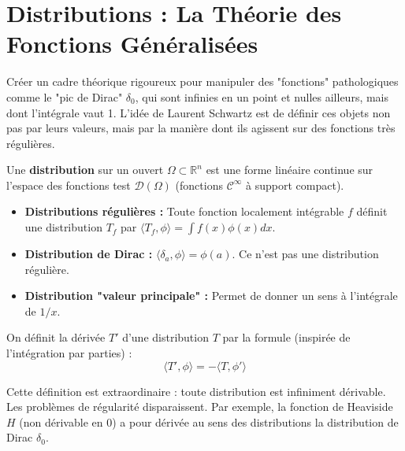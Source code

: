 \section{Distributions : La Théorie des Fonctions Généralisées}

\begin{objectif}
    Créer un cadre théorique rigoureux pour manipuler des "fonctions" pathologiques comme le "pic de Dirac" $\delta_0$, qui sont infinies en un point et nulles ailleurs, mais dont l'intégrale vaut 1. L'idée de Laurent Schwartz est de définir ces objets non pas par leurs valeurs, mais par la manière dont ils agissent sur des fonctions très régulières.
\end{objectif}

\begin{definition}[Distribution]
    Une \textbf{distribution} sur un ouvert $\Omega \subset \mathbb{R}^n$ est une forme linéaire continue sur l'espace des fonctions test $\mathcal{D}(\Omega)$ (fonctions $\mathcal{C}^\infty$ à support compact).
\end{definition}

\begin{example}
    \begin{itemize}
        \item \textbf{Distributions régulières :} Toute fonction localement intégrable $f$ définit une distribution $T_f$ par $\langle T_f, \phi \rangle = \int f(x)\phi(x)dx$.
        \item \textbf{Distribution de Dirac :} $\langle \delta_a, \phi \rangle = \phi(a)$. Ce n'est pas une distribution régulière.
        \item \textbf{Distribution "valeur principale" :} Permet de donner un sens à l'intégrale de $1/x$.
    \end{itemize}
\end{example}

\begin{definition}
    On définit la dérivée $T'$ d'une distribution $T$ par la formule (inspirée de l'intégration par parties) :
    $$ \langle T', \phi \rangle = - \langle T, \phi' \rangle $$
\end{definition}
\begin{remark}
    Cette définition est extraordinaire : toute distribution est infiniment dérivable. Les problèmes de régularité disparaissent. Par exemple, la fonction de Heaviside $H$ (non dérivable en 0) a pour dérivée au sens des distributions la distribution de Dirac $\delta_0$.
\end{remark}

